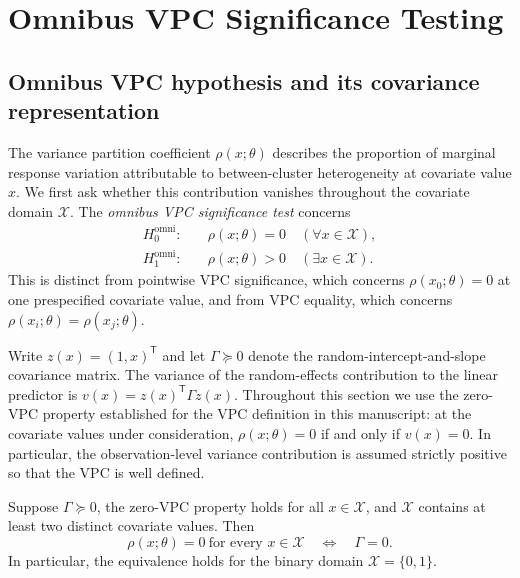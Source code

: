\section{Omnibus VPC Significance Testing}
\label{sec:global_lrt}

\subsection{Omnibus VPC hypothesis and its covariance representation}
\label{subsec:global_hypothesis}
The variance partition coefficient $\rho(x;\theta)$ describes the
proportion of marginal response variation attributable to between-cluster
heterogeneity at covariate value $x$. We first ask whether this
contribution vanishes throughout the covariate domain $\mathcal X$.
The \emph{omnibus VPC significance test} concerns
\begin{equation}\label{eq:sec5-vpc-null}
 \begin{aligned}
 H_0^{\mathrm{omni}}:&\quad
 \rho(x;\theta)=0\quad(\forall x\in\mathcal X),\\
 H_1^{\mathrm{omni}}:&\quad
 \rho(x;\theta)>0\quad(\exists x\in\mathcal X).
 \end{aligned}
\end{equation}
This is distinct from pointwise VPC significance, which concerns
$\rho(x_0;\theta)=0$ at one prespecified covariate value, and from
VPC equality, which concerns $\rho(x_i;\theta)=\rho(x_j;\theta)$.

Write $z(x)=(1,x)^{\mathsf T}$ and let
$\Gamma\succeq0$ denote the random-intercept-and-slope covariance
matrix. The variance of the random-effects contribution to the linear
predictor is $v(x)=z(x)^{\mathsf T}\Gamma z(x)$.
Throughout this section we use the zero-VPC property established for
the VPC definition in this manuscript: at the covariate values under
consideration, $\rho(x;\theta)=0$ if and only if $v(x)=0$.
In particular, the observation-level variance contribution is assumed
strictly positive so that the VPC is well defined.

\begin{proposition}\label{prop:sec5-omnibus-equivalence}
Suppose $\Gamma\succeq0$, the zero-VPC property holds for all
$x\in\mathcal X$, and $\mathcal X$ contains at least two distinct
covariate values. Then
\[
 \rho(x;\theta)=0\ \text{for every }x\in\mathcal X
 \quad\Longleftrightarrow\quad \Gamma=0.
\]
In particular, the equivalence holds for the binary domain
$\mathcal X=\{0,1\}$.
\end{proposition}

